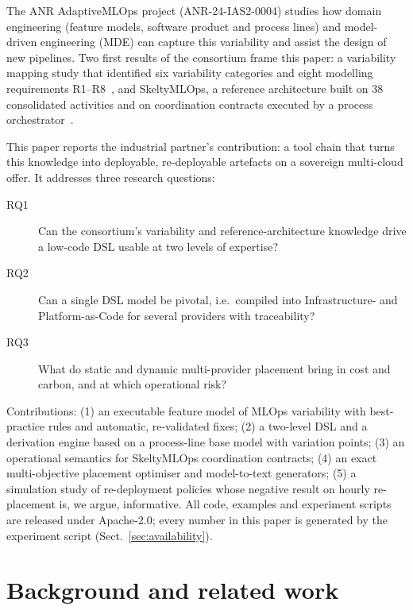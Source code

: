 \documentclass[10pt,a4paper]{article}
\begin{document}
The ANR AdaptiveMLOps project (ANR-24-IAS2-0004) studies how domain engineering
(feature models, software product and process lines) and model-driven engineering
(MDE) can capture this variability and assist the design of new pipelines. Two
first results of the consortium frame this paper: a variability mapping study that
identified six variability categories and eight modelling requirements
R1--R8~\cite{elhatimi2025}, and SkeltyMLOps, a reference architecture built on 38
consolidated activities and on coordination contracts executed by a process
orchestrator~\cite{daoud2025,daoud2026}.

This paper reports the industrial partner's contribution: a tool chain that turns
this knowledge into deployable, re-deployable artefacts on a sovereign multi-cloud
offer. It addresses three research questions:
\begin{description}
\item[RQ1] Can the consortium's variability and reference-architecture knowledge
drive a low-code DSL usable at two levels of expertise?
\item[RQ2] Can a single DSL model be pivotal, i.e.\ compiled into
Infrastructure- and Platform-as-Code for several providers with traceability?
\item[RQ3] What do static and dynamic multi-provider placement bring in cost and
carbon, and at which operational risk?
\end{description}

Contributions: (1) an executable feature model of MLOps variability with
best-practice rules and automatic, re-validated fixes; (2) a two-level DSL and a
derivation engine based on a process-line base model with variation points;
(3) an operational semantics for SkeltyMLOps coordination contracts;
(4) an exact multi-objective placement optimiser and model-to-text generators;
(5) a simulation study of re-deployment policies whose negative result on hourly
re-placement is, we argue, informative. All code, examples and experiment scripts
are released under Apache-2.0; every number in this paper is generated by the
experiment script (Sect.~\ref{sec:availability}).

\section{Background and related work}
\end{document}
